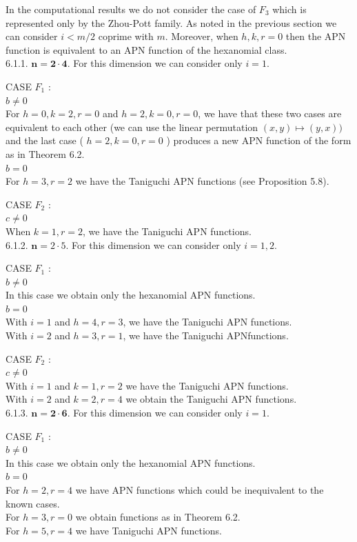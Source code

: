 \documentclass[10pt]{article}
\begin{document}
In the computational results we do not consider the case of $F_{3}$ which is represented only by the Zhou-Pott family. As noted in the previous section we can consider $i<m / 2$ coprime with $m$. Moreover, when $h, k, r=0$ then the APN function is equivalent to an APN function of the hexanomial class.\\
6.1.1. $\mathbf{n}=\mathbf{2} \cdot \mathbf{4}$. For this dimension we can consider only $i=1$.

CASE $F_{1}$ :\\
$b \neq 0$\\
For $h=0, k=2, r=0$ and $h=2, k=0, r=0$, we have that these two cases are equivalent to each other (we can use the linear permutation $(x, y) \mapsto(y, x))$ and the last case ( $h=2, k=0, r=0$ ) produces a new APN function of the form as in Theorem 6.2.\\
$b=0$\\
For $h=3, r=2$ we have the Taniguchi APN functions (see Proposition 5.8).

CASE $F_{2}$ :\\
$c \neq 0$\\
When $k=1, r=2$, we have the Taniguchi APN functions.\\
6.1.2. $\mathbf{n}=2 \cdot 5$. For this dimension we can consider only $i=1,2$.

CASE $F_{1}$ :\\
$b \neq 0$\\
In this case we obtain only the hexanomial APN functions.\\
$b=0$\\
With $i=1$ and $h=4, r=3$, we have the Taniguchi APN functions.\\
With $i=2$ and $h=3, r=1$, we have the Taniguchi APNfunctions.

CASE $F_{2}$ :\\
$c \neq 0$\\
With $i=1$ and $k=1, r=2$ we have the Taniguchi APN functions.\\
With $i=2$ and $k=2, r=4$ we obtain the Taniguchi APN functions.\\
6.1.3. $\mathbf{n}=\mathbf{2} \cdot \mathbf{6}$. For this dimension we can consider only $i=1$.

CASE $F_{1}$ :\\
$b \neq 0$\\
In this case we obtain only the hexanomial APN functions.\\
$b=0$\\
For $h=2, r=4$ we have APN functions which could be inequivalent to the known cases.\\
For $h=3, r=0$ we obtain functions as in Theorem 6.2.\\
For $h=5, r=4$ we have Taniguchi APN functions.
\end{document}
